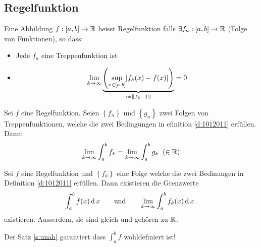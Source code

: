 \subsection{Regelfunktion}
\begin{Def}\label{d:1012011}
  Eine Abbildung $f:[a,b]\to\mathbb{R}$ heisst Regelfunktion falls 
$\exists f_n:[a,b]\to\mathbb{R}$ (Folge von Funktionen), so dass:
  \begin{itemize}
    \item Jede $f_n$ eine Treppenfunktion ist
    \item
      \[\displaystyle\lim_{k\rightarrow\infty}\underbrace{\left( \sup_{x\in[a,b]}\mathopen| f_k (x)-f (x) \mathclose| \right)}_{:=\left\| f_k-f \right\|}=0\]
  \end{itemize}
\end{Def}
\begin{Sat}\label{s:unab}
  Sei $f$ eine Regelfunktion. Seien $\left\{ f_n \right\}$ und $\left\{ g_n \right\}$ zwei Folgen von Treppenfunktionen, welche die zwei Bedingungen in efinition \ref{d:1012011} erfüllen. Dann:
  \[\displaystyle\lim_{k\rightarrow\infty}\int_a^bf_k=\displaystyle\lim_{k\rightarrow\infty}\int_a^bg_k\hspace{2mm}(\in\mathbb{R})\]
\end{Sat}
\begin{Def}
  Sei $f$ eine Regelfunktion und $\left\{ f_k \right\}$ eine Folge welche die 
zwei Bedinungen in Definition \ref{d:1012011} erf\"ullen. Dann existieren die Grenzwerte
\[\int_a^b f(x)\operatorname{d} x \qquad \mbox{und} \qquad \displaystyle\lim_{k\rightarrow\infty}\int_a^bf_k(x)\operatorname{d} x\, .\]
existieren. Ausserdem, sie sind gleich und geh\"oren zu $\mathbb{R}$.
\end{Def}

Der Satz \ref{s:unab} garantiert dass $\int_a^b f$ wohldefiniert ist!

